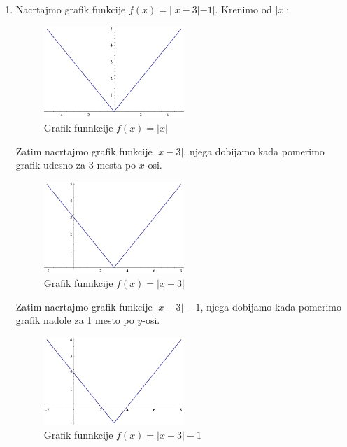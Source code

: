 \documentclass[a4paper,12pt]{article}
\begin{document}
\begin{enumerate}[1.]
\item Nacrtajmo grafik funkcije $f(x) = ||x-3|-1|$. Krenimo od $|x|$:
\begin{figure}[h!]
\begin{center}
\includegraphics[width=0.5\textwidth]{sl1.eps}
\caption{Grafik funnkcije $f(x) = |x|$}
\end{center}
\end{figure}

\par Zatim nacrtajmo grafik funkcije $|x-3|$, njega dobijamo kada pomerimo grafik udesno za 3 mesta po $x$-osi.

\begin{figure}[h!]
\begin{center}
\includegraphics[width=0.5\textwidth]{sl2.eps}
\caption{Grafik funnkcije $f(x) = |x-3|$}
\end{center}
\end{figure}

\par Zatim nacrtajmo grafik funkcije $|x-3 | - 1$, njega dobijamo kada pomerimo grafik nadole za 1 mesto po $y$-osi.
\begin{figure}[h!]
\begin{center}
\includegraphics[width=0.5\textwidth]{sl3.eps}
\caption{Grafik funnkcije $f(x) = |x-3| -1$}
\end{center}
\end{figure}


\end{enumerate}
\end{document}

